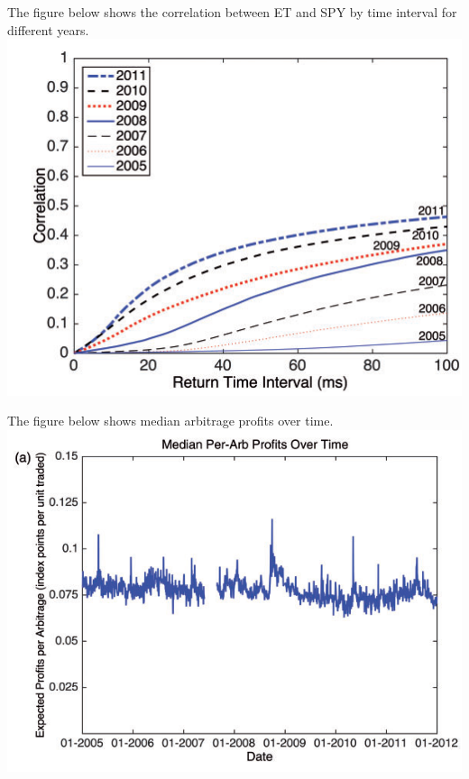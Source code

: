 \documentclass[english,10pt
,aspectratio=169
]{beamer}
\begin{document}
\begin{frame}[noframenumbering]{\citet*{budish_high-frequency_2015}}
	The figure below shows the correlation between ET and SPY by time interval for different years.
	\center
	\includegraphics[scale=0.7]{pics/HTF_Corr_Time}
\end{frame}


\begin{frame}{\citet*{budish_high-frequency_2015}}
	The figure below shows median arbitrage profits over time.
	\center
	\includegraphics[scale=0.7]{pics/HTF_ArbitrageProfitsTime}
\end{frame}
\end{document}
